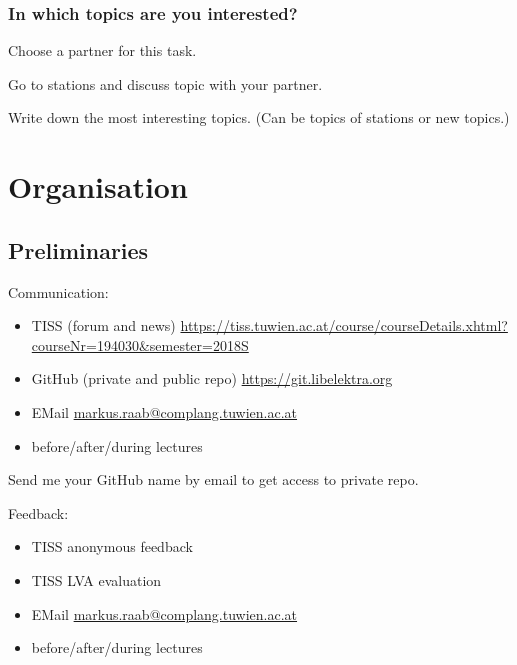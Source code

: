 \begin{assignment}
	\frametitle{In which topics are you interested?}
	\begin{task}[1]
	Choose a partner for this task.
	\end{task}

	\begin{task}[2]
	Go to stations and discuss topic with your partner.
	\end{task}

	\begin{task}[3]
	Write down the most interesting topics.
	(Can be topics of stations or new topics.)
	\end{task}
\end{assignment}





\section{Organisation}

\subsection{Preliminaries}
\begin{frame}
	Communication:
	\begin{itemize}
		\item TISS (forum and news) \url{https://tiss.tuwien.ac.at/course/courseDetails.xhtml?courseNr=194030&semester=2018S}
		\item GitHub (private and public repo) \url{https://git.libelektra.org}
		\item EMail \url{markus.raab@complang.tuwien.ac.at}
		\item before/after/during lectures
	\end{itemize}
\end{frame}

\begin{assignment}
	\begin{task}
	Send me your GitHub name by email to get access to private repo.
	\end{task}
\end{assignment}

\begin{frame}
	Feedback:
	\begin{itemize}
		\item TISS anonymous feedback
		\item TISS LVA evaluation
		\item EMail \url{markus.raab@complang.tuwien.ac.at}
		\item before/after/during lectures
	\end{itemize}
\end{frame}

